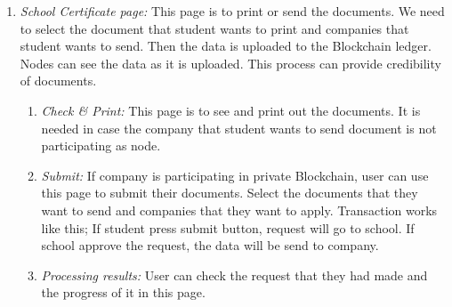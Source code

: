\documentclass[conference]{IEEEtran}
\begin{document}
\begin{enumerate}
    \item \textit {School Certificate page:} This page is to print or send the documents. We need to select the document that student wants to print and companies that student wants to send. Then the data is uploaded to the Blockchain ledger. Nodes can see the data as it is uploaded. This process can provide credibility of documents.\\
    \begin{enumerate}
    	\item \textit {Check \& Print:} This page is to see and print out the documents. It is needed in case the company that student wants to send document is not participating as node.\\
        \item \textit {Submit:} If company is participating in private Blockchain, user can use this page to submit their documents. Select the documents that they want to send and companies that they want to apply. Transaction works like this; If student press submit button, request will go to school. If school approve the request, the data will be send to company. \\
         \item \textit {Processing results:} User can check the request that they had made and the progress of it in this page. \\
    \end{enumerate}
    

\end{enumerate}
\end{document}
